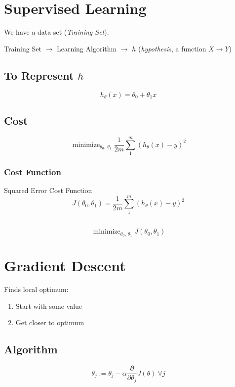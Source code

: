\documentclass[a4paper, 12pt]{report}
\DeclareMathOperator*{\minimize}{minimize}
\begin{document}
\section{Supervised Learning}
We have a data set (\emph{Training Set}).

Training Set $\rightarrow$ Learning Algorithm $\rightarrow$ $h$ (\emph{hypothesis},
a function $X \to Y$)

\subsection*{To Represent \texorpdfstring{$h$}{}}
\begin{equation*}
	h_\theta(x) = \theta_0 + \theta_1x
\end{equation*}

\subsection*{Cost}
\begin{equation*}
	\minimize_{\theta_0,\ \theta_1} \frac{1}{2m}\sum_1^m(h_\theta(x) - y)^2
\end{equation*}
\subsubsection*{Cost Function}
Squared Error Cost Function
\begin{equation*}
	J(\theta_0, \theta_1) = \frac{1}{2m}\sum_1^m(h_\theta(x) - y)^2
\end{equation*}
\subsection*{}
\begin{equation*}
	\minimize_{\theta_0,\ \theta_1} J(\theta_0, \theta_1)
\end{equation*}

\section{Gradient Descent}
Finds local optimum:
\begin{enumerate}
	\item Start with some value
	\item Get closer to optimum
\end{enumerate}

\subsection*{Algorithm}
\begin{equation*}
	\theta_j := \theta_j - \alpha\frac{\partial}{\partial\theta_j}J(\theta) \ \forall j
\end{equation*}
\end{document}
